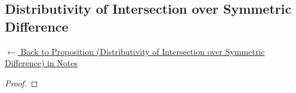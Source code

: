
\subsection*{Distributivity of Intersection over Symmetric Difference}
\label{prf:cap-dist-symmdiff}

\begin{remark*}[Return]
\hyperref[prop:cap-dist-symmdiff]{$\leftarrow$ Back to Proposition (Distributivity of Intersection over Symmetric Difference) in Notes}
\end{remark*}

\begin{proof}
\end{proof}

\begin{remark*}

\end{remark*}

\begin{remark*}[Dependencies]

\FlashUses{}
\end{remark*}
